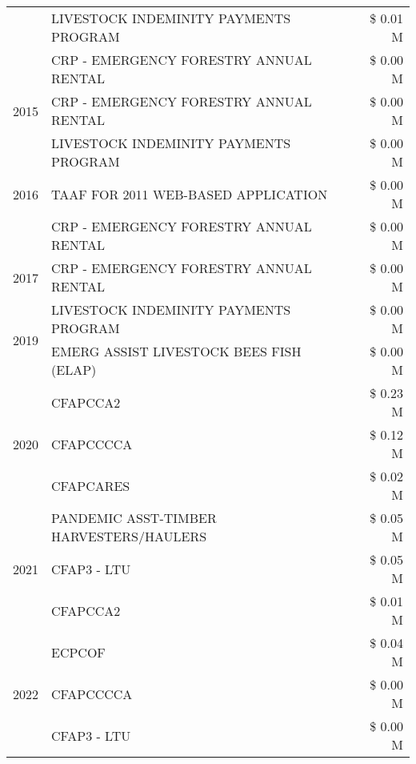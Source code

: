 \begin{tabular}{llr}
 & LIVESTOCK INDEMINITY PAYMENTS PROGRAM & \$ 0.01 M \\
 & CRP - EMERGENCY FORESTRY ANNUAL RENTAL & \$ 0.00 M \\
\cline{1-3}
2015 & CRP - EMERGENCY FORESTRY ANNUAL RENTAL & \$ 0.00 M \\
\cline{1-3}
\multirow[t]{3}{*}{2016} & LIVESTOCK INDEMINITY PAYMENTS PROGRAM & \$ 0.00 M \\
 & TAAF FOR 2011 WEB-BASED APPLICATION & \$ 0.00 M \\
 & CRP - EMERGENCY FORESTRY ANNUAL RENTAL & \$ 0.00 M \\
\cline{1-3}
2017 & CRP - EMERGENCY FORESTRY ANNUAL RENTAL & \$ 0.00 M \\
\cline{1-3}
\multirow[t]{2}{*}{2019} & LIVESTOCK INDEMINITY PAYMENTS PROGRAM & \$ 0.00 M \\
 & EMERG ASSIST LIVESTOCK BEES FISH (ELAP) & \$ 0.00 M \\
\cline{1-3}
\multirow[t]{3}{*}{2020} & CFAPCCA2 & \$ 0.23 M \\
 & CFAPCCCCA & \$ 0.12 M \\
 & CFAPCARES & \$ 0.02 M \\
\cline{1-3}
\multirow[t]{3}{*}{2021} & PANDEMIC ASST-TIMBER HARVESTERS/HAULERS & \$ 0.05 M \\
 & CFAP3 - LTU & \$ 0.05 M \\
 & CFAPCCA2 & \$ 0.01 M \\
\cline{1-3}
\multirow[t]{3}{*}{2022} & ECPCOF & \$ 0.04 M \\
 & CFAPCCCCA & \$ 0.00 M \\
 & CFAP3 - LTU & \$ 0.00 M \\
\cline{1-3}
\bottomrule
\end{tabular}
